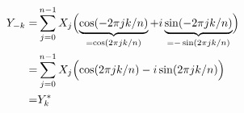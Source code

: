 \documentclass[a4paper, 12pt]{article}
\begin{document}
\begin{align*}
Y_{-k} =& \sum\limits_{j=0}^{n-1} X_j \Bigl( \underbrace{\cos(-2 \pi j k / n)}_{=\cos(2 \pi j k / n)} + i \underbrace{\sin(-2 \pi j k / n)}_{=-\sin(2 \pi j k / n)} \Bigr) \\
       =& \sum\limits_{j=0}^{n-1} X_j \Bigl( \cos(2 \pi j k / n) - i \sin(2 \pi j k / n) \Bigr) \\
       =& Y^{*}_k
\end{align*}
\end{document}

